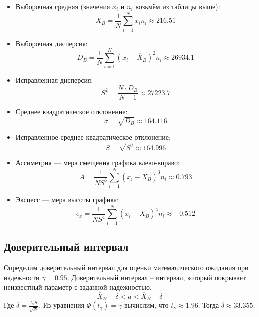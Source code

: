 \documentclass[titlepage]{article}
\begin{document}
\begin{itemize}

\item
Выборочная средняя (значения $x_i$ и $n_i$ возьмём из таблицы выше):
\begin{equation*}
\overline{X}_B = \frac{1}{N} \sum_{i = 1}^N x_i n_i \approx 216.51
\end{equation*}

\item
Выборочная дисперсия:
\begin{equation*}
D_B = \frac{1}{N} \sum_{i = 1}^N (x_i - \overline{X}_B)^2 n_i \approx 26934.1
\end{equation*}

\item
Исправленная дисперсия:
\begin{equation*}
S^2 = \frac{N \cdot D_B}{N - 1} \approx 27223.7
\end{equation*}

\item
Среднее квадратическое отклонение:
\begin{equation*}
\sigma = \sqrt{D_B} \approx 164.116
\end{equation*}

\item
Исправленное среднее квадратическое отклонение:
\begin{equation*}
S = \sqrt{S^2} \approx 164.996
\end{equation*}

\item
Ассиметрия --- мера смещения графика влево-вправо:
\begin{equation*}
A = \frac{1}{N S^3} \sum_{i = 1}^N (x_i - \overline{X}_B)^3 n_i \approx 0.793
\end{equation*}

\item
Эксцесс --- мера высоты графика:
\begin{equation*}
e_x = \frac{1}{N S^4} \sum_{i = 1}^N (x_i - \overline{X}_B)^4 n_i \approx -0.512
\end{equation*}
\end{itemize}

\subsection{Доверительный интервал}
Определим доверительный интервал для оценки математического ожидания при надежности $\gamma = 0.95$.
Доверительный интервал – интервал, который покрывает неизвестный параметр с заданной надёжностью.
\begin{equation*}
\overline{X}_B - \delta < a < \overline{X}_B + \delta
\end{equation*}
Где $\delta = \frac{t_{\gamma} S}{\sqrt N}$. Из уравнения $\Phi (t_{\gamma}) = \gamma$ вычислим, что $t_{\gamma} \approx 1.96$. Тогда $\delta \approx 33.355$.
\end{document}

